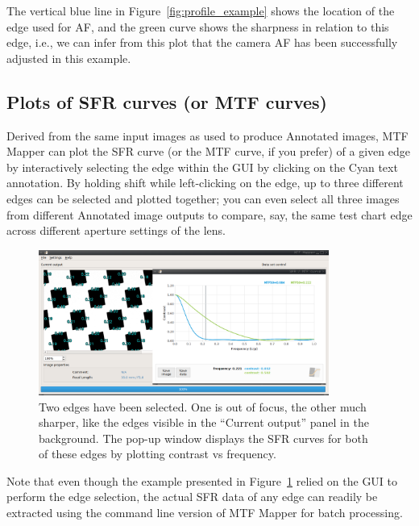 \documentclass[a4paper]{article}
\begin{document}
The vertical blue line in Figure~\ref{fig:profile_example} shows the
location of the edge used for AF, and the green curve shows the sharpness in
relation to this edge, i.e., we can infer from this plot that the camera AF
has been successfully adjusted in this example.

\newpage

\subsection{Plots of SFR curves (or MTF curves)}
\label{sec:sfr_curve}
Derived from the same input images as used to produce \textsf{Annotated
images}, MTF Mapper can plot the SFR curve (or the MTF curve, if you prefer)
of a given edge by interactively selecting the edge within the GUI by
clicking on the Cyan text annotation. By holding shift while left-clicking
on the edge, up to three different edges can be selected and plotted
together; you can even select all three images from different
\textsf{Annotated image} outputs to compare, say, the same test chart edge
across different aperture settings of the lens.

\begin{figure}[!hb]
\centering
\includegraphics[width=0.85\textwidth]{figures/sfr_example}
\caption{Two edges have been selected. One is out of focus, the other much
sharper, like the edges visible in the ``Current output'' panel in the
background. The pop-up window displays the SFR curves for both of these
edges by plotting contrast vs frequency.}
\label{fig:sfr_example}
\end{figure}

Note that even though the example presented in Figure~\ref{fig:sfr_example}
relied on the GUI to perform the edge selection, the actual SFR data of any 
edge can readily be extracted using the command line version of MTF Mapper 
for batch processing.

\newpage
\end{document}
